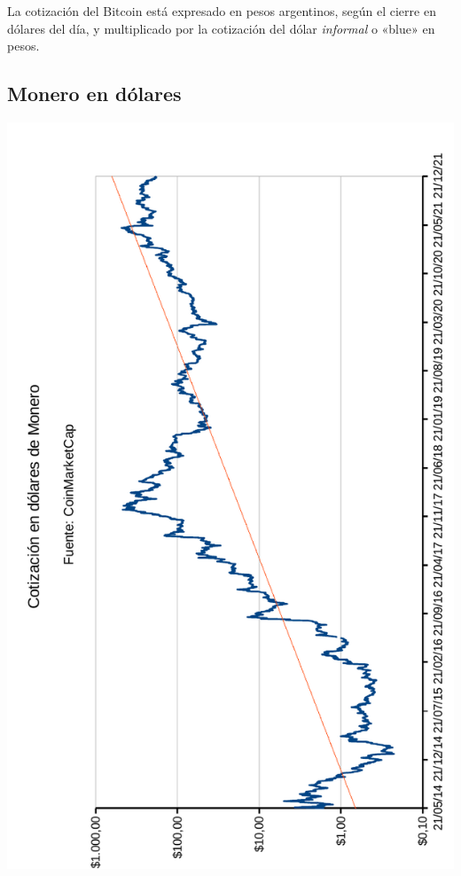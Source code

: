 \documentclass[12pt,a4paper,twoside]{book}
\begin{document}
La cotización del Bitcoin está expresado en pesos argentinos, según el cierre en dólares del día, y multiplicado por la cotización del dólar \textit{informal} o «blue» en pesos.



\newpage

\subsection{Monero en dólares}


\newpage

\begin{center}
\includegraphics[scale=0.975]{img/cot-monero.pdf}
\end{center}
\newpage




\end{document}
